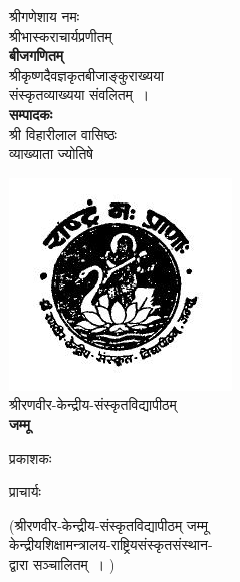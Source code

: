\documentclass[11pt, openany]{book}
\begin{document}
\begin{center}
श्रीगणेशाय नमः\\
\vspace{1cm}
श्रीभास्कराचार्यप्रणीतम्\\
\vspace{5mm}
\textbf{\Huge बीजगणितम् \\}
\vspace{5mm}
श्रीकृष्णदैवज्ञकृतबीजाङ्कुराख्यया\\
\vspace{0.3cm}
संस्कृतव्याख्यया संवलितम्~।\\
\vspace{1cm}
\textbf{\LARGE सम्पादकः\textemdash \\}
\vspace{0.2cm}
{\Large श्री विहारीलाल वासिष्ठः\\ }
\vspace{0.2cm}
व्याख्याता ज्योतिषे \\
\vspace{10mm}

\includegraphics[scale=0.8]{graphics/Capture.PNG}\\
\vspace{0.3cm}
{\Large श्रीरणवीर-केन्द्रीय-संस्कृतविद्यापीठम्}\\
\vspace{0.2cm}
\textbf{\LARGE जम्मू }
\end{center}
\thispagestyle{empty}
\newpage
\noindent प्रकाशकः \\

{\indent\doublespacing\large प्राचार्यः \\
\vspace{-4mm}

\indent (श्रीरणवीर-केन्द्रीय-संस्कृतविद्यापीठम् जम्मू\\
\indent केन्द्रीयशिक्षामन्त्रालय-राष्ट्रियसंस्कृतसंस्थान- \\
\indent द्वारा सञ्चालितम्~। )}\\
\end{document}

